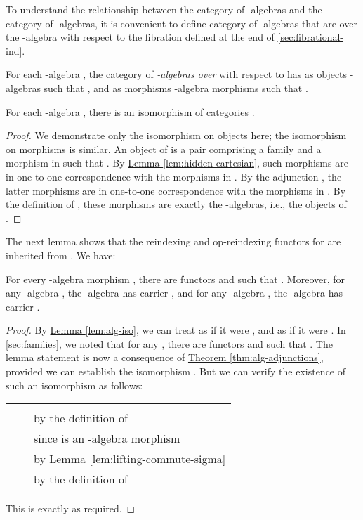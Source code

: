 \documentclass{LMCS}
\newcommand{\lemref}[1]{\hyperref[#1]{Lemma \ref*{#1}}}
\newcommand{\thmref}[1]{\hyperref[#1]{Theorem \ref*{#1}}}
\begin{document}
To understand the relationship between the category of
-algebras and the category of -algebras, it is
convenient to define category of -algebras that are over the
-algebra  with respect to the fibration  defined at
the end of \autoref{sec:fibrational-ind}.

\begin{defi}
  For each -algebra , the category
   of {\em -algebras over }
  with respect to  has as objects -algebras  such that , and as morphisms
  -algebra morphisms  such that .
\end{defi}

\begin{lem}\label{lem:alg-iso}
  For each -algebra , there is an isomorphism of
  categories .
\end{lem}
\begin{proof}
  We demonstrate only the isomorphism on objects here; the isomorphism
  on morphisms is similar. An object of  is a
  pair comprising a family  and a morphism  in  such that . By
  \lemref{lem:hidden-cartesian}, such morphisms  are in one-to-one
  correspondence with the morphisms  in . By the adjunction
  , the latter morphisms are in
  one-to-one correspondence with the morphisms  in . By the definition of
  , these morphisms are exactly the -algebras,
  i.e., the objects of .
\end{proof}

The next lemma shows that the reindexing and op-reindexing functors
for  are inherited from . We have:

\begin{lem}\label{lem:alg-bifibration}
  For every -algebra morphism , there are functors  and
   such that . Moreover, for any -algebra , the -algebra
   has carrier
  , and for any -algebra , the -algebra  has carrier .
\end{lem}

\begin{proof}
  By \lemref{lem:alg-iso}, we can treat  as
  if it were , and  as if it
  were . In \autoref{sec:families}, we noted that for
  any , there are functors  and  such
  that . The lemma statement is now a consequence
  of \thmref{thm:alg-adjunctions}, provided we can establish the isomorphism
  . But we can
  verify the existence of such an isomorphism as follows: 
  \begin{center}
    \begin{tabular}{cll}
      &  & \\
           &  & by the
      definition of  \\
       &  & since  is an -algebra morphism \\
       &  & by \lemref{lem:lifting-commute-sigma} \\
           &  & by the definition of 
    \end{tabular}
  \end{center}
  This is exactly as required.
\end{proof}
\end{document}
